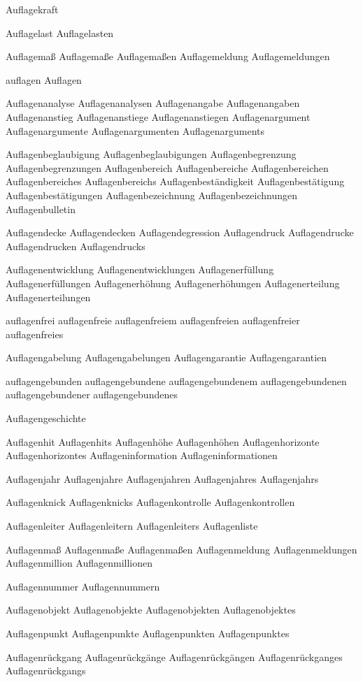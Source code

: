 Auflagekraft

Auflagelast
Auflagelasten

Auflagemaß
Auflagemaße
Auflagemaßen
Auflagemeldung
Auflagemeldungen

auflagen
Auflagen

Auflagenanalyse
Auflagenanalysen
Auflagenangabe
Auflagenangaben
Auflagenanstieg
Auflagenanstiege
Auflagenanstiegen
Auflagenargument
Auflagenargumente
Auflagenargumenten
Auflagenarguments

Auflagenbeglaubigung
Auflagenbeglaubigungen
Auflagenbegrenzung
Auflagenbegrenzungen
Auflagenbereich
Auflagenbereiche
Auflagenbereichen
Auflagenbereiches
Auflagenbereichs
Auflagenbeständigkeit
Auflagenbestätigung
Auflagenbestätigungen
Auflagenbezeichnung
Auflagenbezeichnungen
Auflagenbulletin

Auflagendecke
Auflagendecken
Auflagendegression
Auflagendruck
Auflagendrucke
Auflagendrucken
Auflagendrucks

Auflagenentwicklung
Auflagenentwicklungen
Auflagenerfüllung
Auflagenerfüllungen
Auflagenerhöhung
Auflagenerhöhungen
Auflagenerteilung
Auflagenerteilungen

auflagenfrei
auflagenfreie
auflagenfreiem
auflagenfreien
auflagenfreier
auflagenfreies

Auflagengabelung
Auflagengabelungen
Auflagengarantie
Auflagengarantien

auflagengebunden
auflagengebundene
auflagengebundenem
auflagengebundenen
auflagengebundener
auflagengebundenes

Auflagengeschichte

Auflagenhit
Auflagenhits
Auflagenhöhe
Auflagenhöhen
Auflagenhorizonte
Auflagenhorizontes
Auflageninformation
Auflageninformationen

Auflagenjahr
Auflagenjahre
Auflagenjahren
Auflagenjahres
Auflagenjahrs

Auflagenknick
Auflagenknicks
Auflagenkontrolle
Auflagenkontrollen

Auflagenleiter
Auflagenleitern
Auflagenleiters
Auflagenliste

Auflagenmaß
Auflagenmaße
Auflagenmaßen
Auflagenmeldung
Auflagenmeldungen
Auflagenmillion
Auflagenmillionen

Auflagennummer
Auflagennummern

Auflagenobjekt
Auflagenobjekte
Auflagenobjekten
Auflagenobjektes

Auflagenpunkt
Auflagenpunkte
Auflagenpunkten
Auflagenpunktes

Auflagenrückgang
Auflagenrückgänge
Auflagenrückgängen
Auflagenrückganges
Auflagenrückgangs

